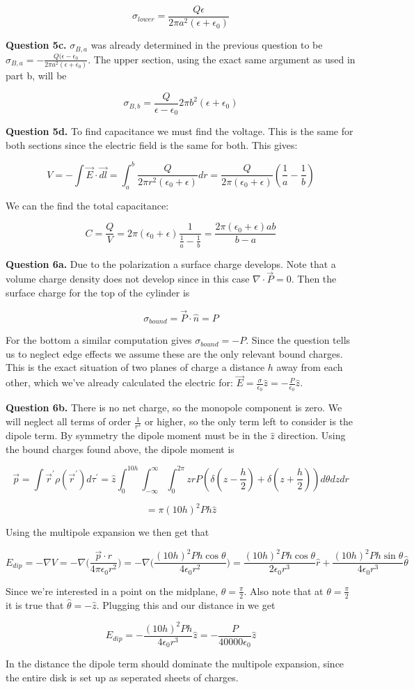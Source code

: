 \documentclass[letterpaper, reqno,11pt]{article}
\newcommand{\ep}{\epsilon}
\begin{document}
\[
    \sigma_{lower} = \frac{Q\epsilon}{2\pi a^2(\epsilon+\epsilon_0)}    
\]

{\noindent\bf Question 5c.} $\sigma_{B,a}$ was already determined in the previous question to be $\sigma_{B,a}=-\frac{Q(\ep-\ep_0}{2\pi a^2(\ep+\ep_0)}$. The upper section, using the exact same argument as used in part b, will be 

\[
    \sigma_{B,b}=\frac{Q}{\ep-\ep_0}{2\pi b^2(\ep+\ep_0)}    
\]

{\noindent\bf Question 5d.} To find capacitance we must find the voltage. This is the same for both sections since the electric field is the same for both. This gives:  

\[
    V=-\int \vec E\cdot \vec {dl}=\int_a^b\frac{Q}{2\pi r^2(\ep_0+\ep)}dr=\frac Q{2\pi(\ep_0+\ep)}(\frac1a-\frac1b)
\]

We can the find the total capacitance: 

\[
    C=\frac QV=2\pi(\ep_0+\ep)\frac1{\frac1a-\frac1b}=\frac{2\pi(\ep_0+\ep)ab}{b-a}
\]


{\noindent\bf Question 6a.} Due to the polarization a surface charge develops. Note that a volume charge density does not develop since in this case $\nabla\cdot \vec P=0$. Then the surface charge for the top of the cylinder is 

$$
    \sigma_{bound}=\vec P\cdot \hat n=P
$$

For the bottom a similar computation gives $\sigma_{bound}=-P$. Since the question tells us to neglect edge effects we assume these are the only relevant bound charges. This is the exact situation of two planes of charge a distance $h$ away from each other, which we've already calculated the electric for: $\vec E=\frac{\sigma}{\epsilon_0}\hat z=-\frac{P}{\ep_0}\hat z$. 

{\noindent\bf Question 6b.} There is no net charge, so the monopole component is zero. We will neglect all terms of order $\frac 1{r^3}$ or higher, so the only term left to consider is the dipole term. By symmetry the dipole moment must be in the $\hat z$ direction. Using the bound charges found above, the dipole moment is 

\[
    \vec p = \int\vec r^\prime\rho(\vec r^\prime)d\tau^\prime = \hat z\int_0^{10h}\int_{-\infty}^\infty\int_0^{2\pi}zrP(\delta(z-\frac h2)+\delta(z+\frac h2))d\theta dzdr
\]

\[
    =\pi (10h)^2 Ph\hat z
\]

Using the multipole expansion we then get that 

\[
    E_{dip}=-\nabla V=-\nabla\bigg(\frac{\vec p\cdot\hat r}{4\pi\epsilon_0 r^2}\bigg)=-\nabla\bigg(\frac{(10h)^2Ph\cos\theta}{4\ep_0 r^2}\bigg)=\frac{(10h)^2Ph\cos\theta}{2\ep_0 r^3}\hat r+\frac{(10h)^2Ph\sin\theta}{4\epsilon_0 r^3}\hat\theta
\]

Since we're interested in a point on the midplane, $\theta=\frac\pi2$. Also note that at $\theta=\frac\pi2$ it is true that $\hat\theta=-\hat z$. Plugging this and our distance in we get 

$$
    E_{dip}=-\frac{(10h)^2Ph}{4\epsilon_0 r^3}\hat z=-\frac{P}{40000\epsilon_0}\hat z
$$

In the distance the dipole term should dominate the multipole expansion, since the entire disk is set up as seperated sheets of charges. 
\end{document}
